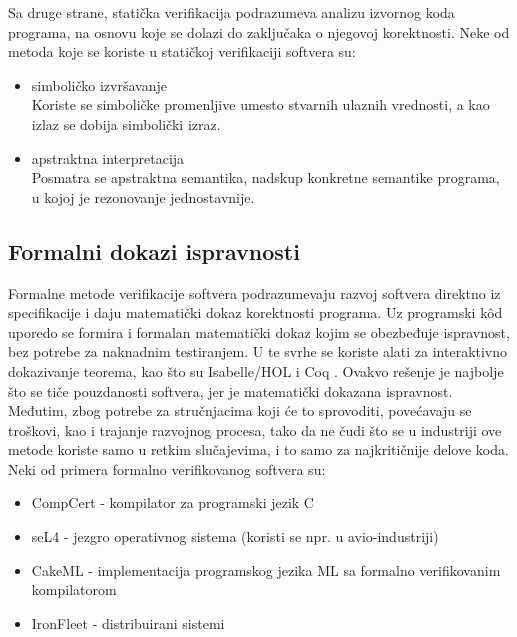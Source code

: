 \documentclass[a4paper]{article}
\begin{document}
Sa druge strane, statička verifikacija podrazumeva analizu izvornog koda programa, na osnovu koje se dolazi do zaključaka o njegovoj korektnosti.
Neke od metoda koje se koriste u statičkoj verifikaciji softvera su:
\begin{itemize}
\item simboličko izvršavanje \cite{symbolic_execution}\\
Koriste se simboličke promenljive umesto stvarnih ulaznih vrednosti, a kao izlaz se dobija simbolički izraz.
\item apstraktna interpretacija \cite{abstract_interpretation}\\
Posmatra se apstraktna semantika, nadskup konkretne semantike programa, u kojoj je rezonovanje jednostavnije.

\end{itemize}


\subsection{Formalni dokazi ispravnosti}
\label{subsec:formalni_dokazi}
Formalne metode verifikacije softvera podrazumevaju razvoj softvera direktno iz specifikacije i daju matematički dokaz korektnosti programa.
Uz programski k\^{o}d uporedo se formira i formalan matematički dokaz kojim se obezbeđuje ispravnost, bez potrebe za naknadnim testiranjem.
U te svrhe se koriste alati za interaktivno dokazivanje teorema, kao što su Isabelle/HOL \cite{isabelle} i Coq \cite{coq}.
Ovakvo rešenje je najbolje što se tiče pouzdanosti softvera, jer je matematički dokazana ispravnost.
Međutim, zbog potrebe za stručnjacima koji će to sprovoditi, povećavaju se troškovi, kao i trajanje razvojnog procesa, tako da ne čudi što se u industriji ove metode koriste samo u retkim slučajevima, i to samo za najkritičnije delove koda.\\
Neki od primera formalno verifikovanog softvera su:
\begin{itemize}
\item CompCert - kompilator za programski jezik C \cite{compcert}
\item seL4 - jezgro operativnog sistema (koristi se npr. u avio-industriji) \cite{sel4}
\item CakeML - implementacija programskog jezika ML sa formalno verifikovanim kompilatorom \cite{cakeml}
\item IronFleet - distribuirani sistemi \cite{ironfleet}
\end{itemize}
\end{document}
